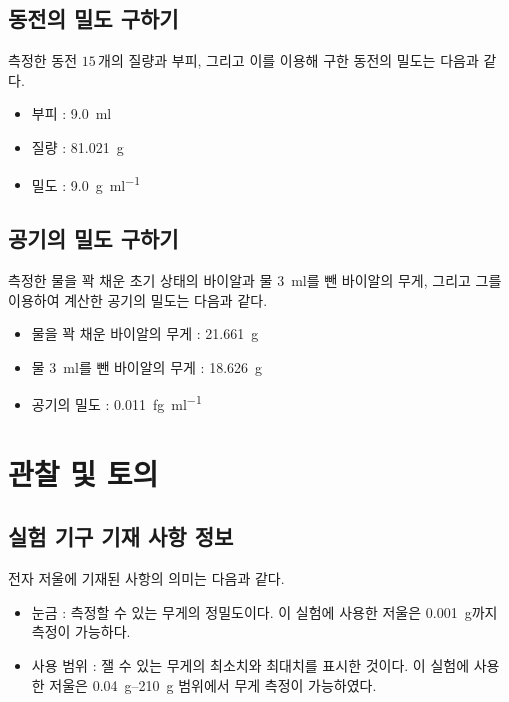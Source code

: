 \documentclass{GSHS-chemexp}
\begin{document}
	\subsection{동전의 밀도 구하기}
	측정한 동전 $15\,\mbox{개}$의 질량과 부피, 그리고 이를 이용해 구한
	동전의 밀도는 다음과 같다.
	\begin{itemize}
		\item 부피 : \SI{9.0}{\milli\litre}
		\item 질량 : \SI{81.021}{\gram}
		\item 밀도 : \SI{9.0}{\gram\per\milli\litre}
	\end{itemize}
	
	\subsection{공기의 밀도 구하기}
	측정한 물을 꽉 채운 초기 상태의 바이알과 물 \SI{3}{\milli\litre}를 뺀
	바이알의 무게, 그리고 그를 이용하여 계산한 공기의 밀도는 다음과 같다.
	\begin{itemize}
		\item 물을 꽉 채운 바이알의 무게 : \SI{21.661}{\gram}
		\item 물 \SI{3}{\milli\litre}를 뺀 바이알의 무게 :  \SI{18.626}{\gram}
		\item 공기의 밀도 : \SI{0.011}{\femto\gram\per\milli\litre}
	\end{itemize}
	
	\section{관찰 및 토의}
	
	\subsection{실험 기구 기재 사항 정보}
	전자 저울에 기재된 사항의 의미는 다음과 같다.
	\begin{itemize}
		\item 눈금 : 측정할 수 있는 무게의 정밀도이다.
		이 실험에 사용한 저울은 \SI{0.001}{\gram}까지 측정이 가능하다.
		\item 사용 범위 : 잴 수 있는 무게의 최소치와 최대치를 표시한 것이다.
		이 실험에 사용한 저울은 \SIrange{0.04}{210}{\gram} 범위에서
		무게 측정이 가능하였다.
	\end{itemize}
	
\end{document}
